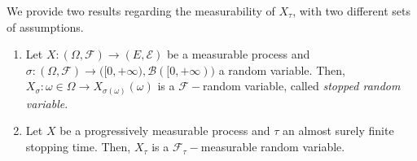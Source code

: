 \begin{proposition}
    We provide two results regarding the measurability of $X_{\tau}$, with two different sets of assumptions.
    \begin{enumerate}
        \item Let $X : (\Omega, \mathcal{F}) \to (E,\mathcal{E})$ be a measurable process and $\sigma : (\Omega,\mathcal{F}) \to \big([0,+\infty), \mathcal{B}([0,+\infty)\big)$ a random variable. Then, $X_{\sigma} : \omega \in \Omega \to X_{\sigma(\omega)}(\omega)$ is a $\mathcal{F}-$random variable, called \textit{stopped random variable}.
        \item Let $X$ be a progressively measurable process and $\tau$ an almost surely finite stopping time. Then, $X_{\tau}$ is a $\mathcal{F}_{\tau}-$measurable random variable. 
    \end{enumerate}
\end{proposition}
